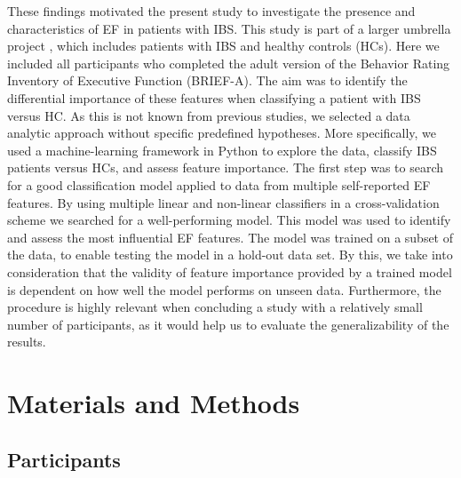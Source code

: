 \documentclass[jcm,article,submit,pdftex,moreauthors]{Definitions/mdpi}
\begin{document}
These findings motivated the present study to investigate the presence and characteristics of EF in patients with IBS. This study is part of a larger umbrella project 
 \cite{berentsen2020study}, which includes patients with IBS and healthy controls (HCs). Here we included all participants who completed the adult version of the Behavior Rating Inventory of Executive Function (BRIEF-A). The aim was to identify the differential importance of these features when classifying a patient with IBS versus HC. As this is not known from previous studies, we selected a data analytic approach without specific predefined hypotheses. 
More specifically, we used a machine-learning framework in Python to explore the data, classify IBS patients versus HCs, and assess feature importance. The first step was to search for a good classification model applied to data from multiple self-reported EF features. By using multiple linear and non-linear classifiers in a cross-validation scheme we searched for a well-performing model. This model was used to identify and assess the most influential EF features. The model was trained on a subset of the data, to enable testing the model in a hold-out data set. By this, we take into consideration that the validity of feature importance provided by a trained model is dependent on how well the model performs on unseen data. Furthermore, the procedure is highly relevant when concluding a study with a relatively small number of participants, as it would help us to evaluate the generalizability of the results.


\section{Materials and Methods}

\subsection{Participants}
\end{document}
